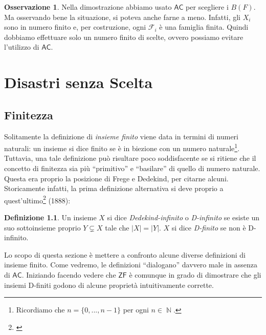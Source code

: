 \documentclass[12pt,a4paper]{report}
\theoremstyle{definition}
\newtheorem{defn}[teo]{Definizione}  %
\newtheorem{oss}[teo]{Osservazione}  %
\theoremstyle{num.custom-title}
\DeclareMathOperator{\N}{\mathbb{N}}
\newcommand{\AC}{\ensuremath{\mathsf{AC}}\xspace}
\newcommand{\ZF}{\ensuremath{\mathsf{ZF}}\xspace}
\begin{document}
\begin{oss}
Nella dimostrazione abbiamo usato \AC per scegliere i $B(F)$. Ma osservando bene la situazione, si poteva anche farne a meno. Infatti, gli $X_i$ sono in numero finito e, per costruzione, ogni $\mathcal{F}_i$ è una famiglia finita. Quindi dobbiamo effettuare solo un numero finito di scelte, ovvero possiamo evitare l'utilizzo di \AC.
\end{oss}




\chapter{Disastri senza Scelta}


\section{Finitezza}

Solitamente la definizione di \emph{insieme finito} viene data in termini di numeri naturali: un insieme si dice finito se è in biezione con un numero naturale\footnote{Ricordiamo che $n=\{0,...,n-1\}$ per ogni $n \in \N$.}. Tuttavia, una tale definizione può risultare poco soddisfacente se si ritiene che il concetto di finitezza sia più ``primitivo'' e ``basilare'' di quello di numero naturale. Questa era proprio la posizione di Frege e Dedekind, per citarne alcuni. Storicamente infatti, la prima definizione alternativa si deve proprio a quest'ultimo\footnote{\cite{Ded1888:Herrlich}} (1888):

\begin{defn}
Un insieme $X$ si dice \emph{Dedekind-infinito} o \emph{D-infinito} se esiste un suo sottoinsieme proprio $Y \subsetneq X$ tale che $|X|=|Y|$. $X$ si dice \emph{D-finito} se non è D-infinito.
\end{defn}

Lo scopo di questa sezione è mettere a confronto alcune diverse definizioni di insieme finito. Come vedremo, le definizioni ``dialogano'' davvero male in assenza di \AC. Iniziando facendo vedere che \ZF è comunque in grado di dimostrare che gli insiemi D-finiti godono di alcune proprietà intuitivamente corrette.
\end{document}
